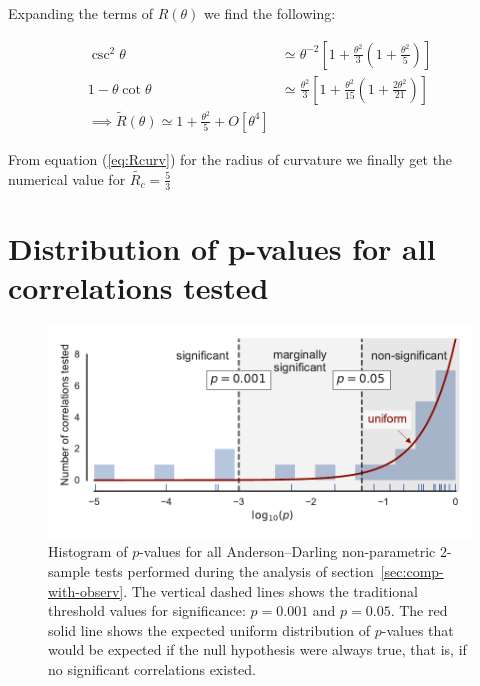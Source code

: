 Expanding the terms of $R(\theta)$ we find the following:

\begin{align}
  \csc^2\theta &\simeq \theta^{-2}\left[1+\frac{\theta^2}{3}\left(1+\frac{\theta^2}{5}\right)\right] \\
  1-\theta\cot\theta &\simeq \frac{\theta^2}{3}\left[1 + \frac{\theta^2}{15}\left(1+\frac{2\theta^2}{21}\right)\right] \\
  \implies \tilde{R}(\theta) \simeq 1 + \frac{\theta^2}{5} + O\left[\theta^4\right]
\end{align}

From equation (\ref{eq:Rcurv}) for the radius of curvature we finally get the numerical value for $\tilde{R_c} = \frac{5}{3}$

\section{Distribution of p-values for all correlations tested}
\label{sec:distr-p-values}

\begin{figure}
  \centering
  \includegraphics[width=\linewidth]{figs/p-value-histogram}
  \caption{Histogram of \(p\)-values for all Anderson--Darling
    non-parametric 2-sample tests performed during the analysis of
    section~\ref{sec:comp-with-observ}.  The vertical dashed lines
    shows the traditional threshold values for significance:
    \(p = 0.001\) and \(p = 0.05\). The red solid line shows the
    expected uniform distribution of \(p\)-values that would be
    expected if the null hypothesis were always true, that is, if no
    significant correlations existed.}
  \label{fig:histo-p-values}
\end{figure}


